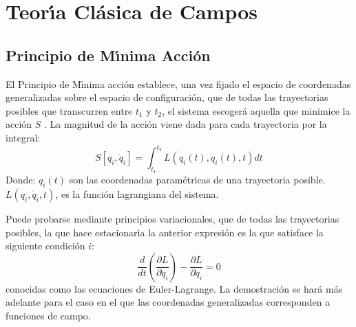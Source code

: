 \chapter{Teor\'\i a Cl\'asica de Campos}
\label{chap:tcc} %
\section{Principio de M\'\i nima Acci\'on}
\label{sec:la}

El Principio de M\'\i nima acci\'on establece, una vez fijado el espacio de
coordenadas generalizadas sobre el espacio de configuraci\'on, que de
todas las trayectorias posibles que transcurren entre $t_1$ y $t_2$,
el sistema escoger\'a aquella que minimice la acci\'on $S$
\cite{ActionPhysics}.  La magnitud de la acci\'on viene dada para cada
trayectoria por la integral:
\begin{equation}
  \label{eq:la}
   S\left[q_i,\dot{q}_i\right] = \int_{t_{1}}^{t_{2}} L(q_i(t), \dot{q}_i(t),t) dt
\end{equation}
Donde:
$q_i(t)$ son las coordenadas param\'etricas de una trayectoria posible.
$L(q_i,\dot{q}_i,t)$, es la funci\'on lagrangiana del sistema.


Puede probarse mediante principios variacionales, que de todas las trayectorias posibles, la que hace  estacionaria la anterior expresi\'on es la que satisface la siguiente condici\'on $i$:
\begin{equation}
  \label{eq:eel}
 \frac{d}{dt} \left ( \frac{\partial L}{\partial\dot{q}_i} \right ) - \frac{\partial L}{\partial q_i} = 0
\end{equation}
conocidas como las ecuaciones de Euler-Lagrange. La demostraci\'on se
har\'a m\'as adelante para el caso en el que las coordenadas generalizadas
corresponden a funciones de campo. 

